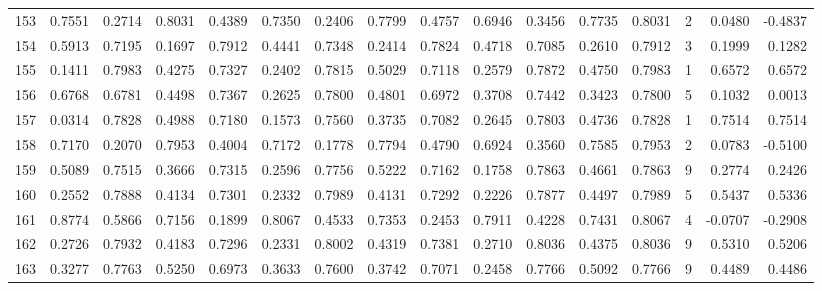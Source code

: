 \begin{tabular}{lrrrrrrrrrrrrrrr}
153 &      0.7551 &  0.2714 &  0.8031 &  0.4389 &  0.7350 &  0.2406 &  0.7799 &  0.4757 &  0.6946 &  0.3456 &   0.7735 &     0.8031 &      2 &                    0.0480 &                    -0.4837 \\
154 &      0.5913 &  0.7195 &  0.1697 &  0.7912 &  0.4441 &  0.7348 &  0.2414 &  0.7824 &  0.4718 &  0.7085 &   0.2610 &     0.7912 &      3 &                    0.1999 &                     0.1282 \\
155 &      0.1411 &  0.7983 &  0.4275 &  0.7327 &  0.2402 &  0.7815 &  0.5029 &  0.7118 &  0.2579 &  0.7872 &   0.4750 &     0.7983 &      1 &                    0.6572 &                     0.6572 \\
156 &      0.6768 &  0.6781 &  0.4498 &  0.7367 &  0.2625 &  0.7800 &  0.4801 &  0.6972 &  0.3708 &  0.7442 &   0.3423 &     0.7800 &      5 &                    0.1032 &                     0.0013 \\
157 &      0.0314 &  0.7828 &  0.4988 &  0.7180 &  0.1573 &  0.7560 &  0.3735 &  0.7082 &  0.2645 &  0.7803 &   0.4736 &     0.7828 &      1 &                    0.7514 &                     0.7514 \\
158 &      0.7170 &  0.2070 &  0.7953 &  0.4004 &  0.7172 &  0.1778 &  0.7794 &  0.4790 &  0.6924 &  0.3560 &   0.7585 &     0.7953 &      2 &                    0.0783 &                    -0.5100 \\
159 &      0.5089 &  0.7515 &  0.3666 &  0.7315 &  0.2596 &  0.7756 &  0.5222 &  0.7162 &  0.1758 &  0.7863 &   0.4661 &     0.7863 &      9 &                    0.2774 &                     0.2426 \\
160 &      0.2552 &  0.7888 &  0.4134 &  0.7301 &  0.2332 &  0.7989 &  0.4131 &  0.7292 &  0.2226 &  0.7877 &   0.4497 &     0.7989 &      5 &                    0.5437 &                     0.5336 \\
161 &      0.8774 &  0.5866 &  0.7156 &  0.1899 &  0.8067 &  0.4533 &  0.7353 &  0.2453 &  0.7911 &  0.4228 &   0.7431 &     0.8067 &      4 &                   -0.0707 &                    -0.2908 \\
162 &      0.2726 &  0.7932 &  0.4183 &  0.7296 &  0.2331 &  0.8002 &  0.4319 &  0.7381 &  0.2710 &  0.8036 &   0.4375 &     0.8036 &      9 &                    0.5310 &                     0.5206 \\
163 &      0.3277 &  0.7763 &  0.5250 &  0.6973 &  0.3633 &  0.7600 &  0.3742 &  0.7071 &  0.2458 &  0.7766 &   0.5092 &     0.7766 &      9 &                    0.4489 &                     0.4486 \\

\end{tabular}
